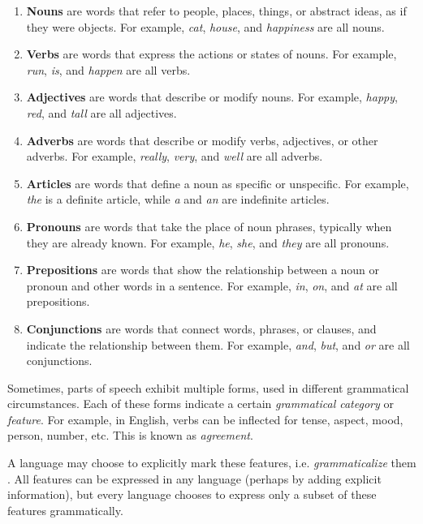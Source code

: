 \begin{enumerate}
    \item \textbf{Nouns} are words that refer to people, places, things, or abstract ideas, as if they were objects. For example, \textit{cat}, \textit{house}, and \textit{happiness} are all nouns.
    \item \textbf{Verbs} are words that express the actions or states of nouns. For example, \textit{run}, \textit{is}, and \textit{happen} are all verbs.
    \item \textbf{Adjectives} are words that describe or modify nouns. For example, \textit{happy}, \textit{red}, and \textit{tall} are all adjectives.
    \item \textbf{Adverbs} are words that describe or modify verbs, adjectives, or other adverbs. For example, \textit{really}, \textit{very}, and \textit{well} are all adverbs.
    \item \textbf{Articles} are words that define a noun as specific or unspecific. For example, \textit{the} is a definite article, while \textit{a} and \textit{an} are indefinite articles.
    \item \textbf{Pronouns} are words that take the place of noun phrases, typically when they are already known. For example, \textit{he}, \textit{she}, and \textit{they} are all pronouns.
    \item \textbf{Prepositions} are words that show the relationship between a noun or pronoun and other words in a sentence. For example, \textit{in}, \textit{on}, and \textit{at} are all prepositions.
    \item \textbf{Conjunctions} are words that connect words, phrases, or clauses, and indicate the relationship between them. For example, \textit{and}, \textit{but}, and \textit{or} are all conjunctions.
\end{enumerate}

Sometimes, parts of speech exhibit multiple forms, used in different grammatical circumstances. Each of these forms indicate a certain \textit{grammatical category} 
or \textit{feature}. For example, in English, verbs can be inflected for tense, aspect, mood, person, number, etc. This is known as \textit{agreement}.

A language may choose to explicitly mark these features, i.e. \textit{grammaticalize} them \cite{rosenfelder2010language}. All features can be
expressed in any language (perhaps by adding explicit information), but every language chooses to express only a subset of these features grammatically.

